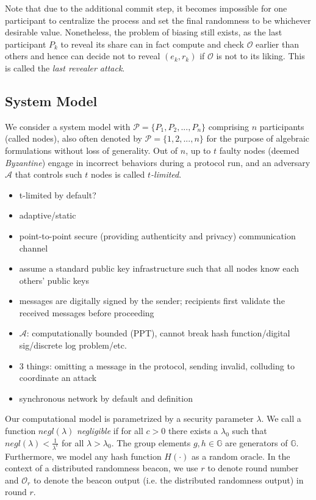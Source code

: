 \documentclass[letterpaper,twocolumn,10pt]{article}
\theoremstyle{definition}
\theoremstyle{remark}
\begin{document}
Note that due to the additional commit step, it becomes impossible for one participant to centralize the process and set the final randomness to be whichever desirable value. Nonetheless, the problem of biasing still exists, as the last participant $P_k$ to reveal its share can in fact compute and check $\mathcal{O}$ earlier than others and hence can decide not to reveal $(e_k, r_k)$ if $\mathcal{O}$ is not to its liking. This is called the \textit{last revealer attack}.

\subsection{System Model}
We consider a system model with $\mathcal{P} = \{P_1, P_2, ..., P_n\}$ comprising $n$ participants (called nodes), also often denoted by $\mathcal{P} = \{1, 2, ..., n\}$ for the purpose of algebraic formulations without loss of generality. Out of $n$, up to $t$ faulty nodes (deemed \textit{Byzantine}) engage in incorrect behaviors during a protocol run, and an adversary $\mathcal{A}$ that controls such $t$ nodes is called \textit{$t$-limited}.

\begin{itemize}
\item t-limited by default?
\item adaptive/static
\item point-to-point secure (providing authenticity and privacy) communication channel
\item assume a standard public key infrastructure such that all nodes know each others' public keys
\item messages are digitally signed by the sender; recipients first validate the received messages before proceeding
\item $\mathcal{A}$: computationally bounded (PPT), cannot break hash function/digital sig/discrete log problem/etc.
\item 3 things: omitting a message in the protocol, sending invalid, colluding to coordinate an attack
\item synchronous network by default and definition
\end{itemize}

Our computational model is parametrized by a security parameter $\lambda$. We call a function $negl(\lambda)$ \textit{negligible} if for all $c > 0$ there exists a $\lambda_0$ such that $negl(\lambda) < \frac{1}{\lambda^c}$ for all $\lambda > \lambda_0$. The group elements $g, h \in \mathbb{G}$ are generators of $\mathbb{G}$. Furthermore, we model any hash function $H(\cdot)$ as a random oracle. In the context of a distributed randomness beacon, we use $r$ to denote round number and $\mathcal{O}_r$ to denote the beacon output (i.e. the distributed randomness output) in round $r$.
\end{document}

